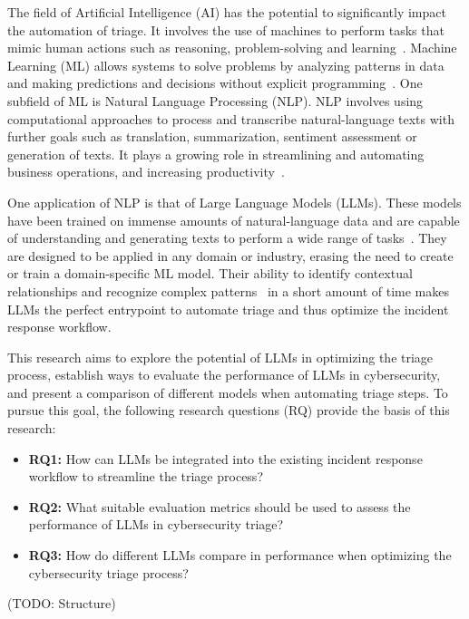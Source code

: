 The field of Artificial Intelligence (AI) has the potential to significantly impact the automation of triage.
It involves the use of machines to perform tasks that mimic human actions such as reasoning, problem-solving and
learning\ \citep{oed:ai}.
Machine Learning (ML) allows systems to solve problems by analyzing patterns in data and making
predictions and decisions without explicit programming\ \citep{oed:ml}.
One subfield of ML is Natural Language Processing (NLP).
NLP involves using computational approaches to process and transcribe natural-language texts with further goals such as
translation, summarization, sentiment assessment or generation of texts.
It plays a growing role in streamlining and automating business operations, and increasing
productivity\ \citep{ibm:nlp}.

One application of NLP is that of Large Language Models (LLMs).
These models have been trained on immense amounts of natural-language data and are capable of understanding and
generating texts to perform a wide range of tasks\ \citep{ibm:llm}.
They are designed to be applied in any domain or industry, erasing the need to create or train a domain-specific ML
model.
Their ability to identify contextual relationships and recognize complex patterns\ \citep{bordt2024data} in a short
amount of time makes LLMs the perfect entrypoint to automate triage and thus optimize the incident response workflow.

This research aims to explore the potential of LLMs in optimizing the triage process, establish ways to
evaluate the performance of LLMs in cybersecurity, and present a comparison of different models when automating triage
steps.
To pursue this goal, the following research questions (RQ) provide the basis of this research:

\begin{itemize}
    \item \textbf{RQ1:} How can LLMs be integrated into the existing incident response workflow to streamline the triage
    process?
    \item \textbf{RQ2:} What suitable evaluation metrics should be used to assess the performance of LLMs in
    cybersecurity triage?
    \item \textbf{RQ3:} How do different LLMs compare in performance when optimizing the cybersecurity triage process?
\end{itemize}

(TODO: Structure) %
